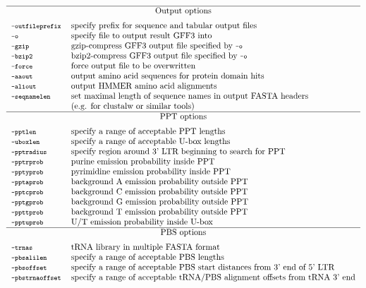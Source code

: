 \documentclass[12pt,titlepage]{article}
\begin{document}
\begin{table}[htbp]
\begin{footnotesize}
\[\begin{tabular}{ll}
\Showoptiongroup{Output options}
\Showoption{outfileprefix}& specify prefix for sequence and tabular output files
\\
\Showoption{o}& specify file to output result GFF3 into
\\
\Showoption{gzip}& gzip-compress GFF3 output file specified by \Showoption{o}
\\
\Showoption{bzip2}& bzip2-compress GFF3 output file specified by \Showoption{o}
\\
\Showoption{force}& force output file to be overwritten
\\
\Showoption{aaout}& output amino acid sequences for protein domain hits
\\
\Showoption{aliout}& output HMMER amino acid alignments
\\
\Showoption{seqnamelen}& set maximal length of sequence names in output FASTA headers\\
                       & (e.g. for clustalw or similar tools)
\\
\Showoptiongroup{PPT options}
\Showoption{pptlen}& specify a range of acceptable PPT lengths
\\
\Showoption{uboxlen}& specify a range of acceptable U-box lengths
\\
\Showoption{pptradius}& specify region around 3' LTR beginning to search for PPT
\\
\Showoption{pptrprob}& purine emission probability inside PPT
\\
\Showoption{pptyprob}& pyrimidine emission probability inside PPT
\\
\Showoption{pptaprob}& background A emission probability outside PPT
\\
\Showoption{pptcprob}& background C emission probability outside PPT
\\
\Showoption{pptgprob}& background G emission probability outside PPT
\\
\Showoption{ppttprob}& background T emission probability outside PPT
\\
\Showoption{pptuprob}& U/T emission probability inside U-box
\\
\Showoptiongroup{PBS options}
\Showoption{trnas}& tRNA library in multiple FASTA format
\\
\Showoption{pbsalilen}& specify a range of acceptable PBS lengths
\\
\Showoption{pbsoffset}& specify a range of acceptable PBS start distances from 3' end of 5' LTR
\\
\Showoption{pbstrnaoffset}& specify a range of acceptable tRNA/PBS alignment offsets from tRNA 3' end

\end{tabular}\]
\end{footnotesize}
\end{table}
\end{document}
